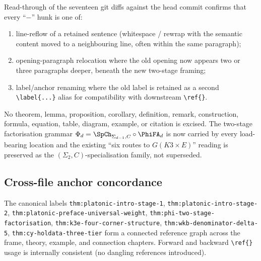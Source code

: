 Read-through of the seventeen git diffs against the head commit
confirms that every ``$-$'' hunk is one of:
\begin{enumerate}[label=(\roman*)]
\item line-reflow of a retained sentence (whitespace / rewrap with
the semantic content moved to a neighbouring line, often within the
same paragraph);
\item opening-paragraph relocation where the old opening now appears
two or three paragraphs deeper, beneath the new two-stage framing;
\item label/anchor renaming where the old label is retained as a
second \verb|\label{...}| alias for compatibility with downstream
\verb|\ref{}|.
\end{enumerate}
No theorem, lemma, proposition, corollary, definition, remark,
construction, formula, equation, table, diagram, example, or
citation is excised. The two-stage factorisation grammar
$\Phi_d = \SpCh_{\Sigma_{d-1}, C} \circ \PhiFA_d$ is now carried
by every load-bearing location and the existing ``six routes to
$G(K3 \times E)$'' reading is preserved as the
$(\Sigma_2, C)$-specialisation family, not superseded.

\subsection*{Cross-file anchor concordance}

The canonical labels \texttt{thm:platonic-intro-stage-1},
\texttt{thm:platonic-intro-stage-2},
\texttt{thm:platonic-preface-universal-weight},
\texttt{thm:phi-two-stage-factorisation},
\texttt{thm:k3e-four-corner-structure},
\texttt{thm:wkb-denominator-delta-5},
\texttt{thm:cy-holdata-three-tier} form a connected reference
graph across the frame, theory, example, and connection chapters.
Forward and backward \verb|\ref{}| usage is internally consistent
(no dangling references introduced).
